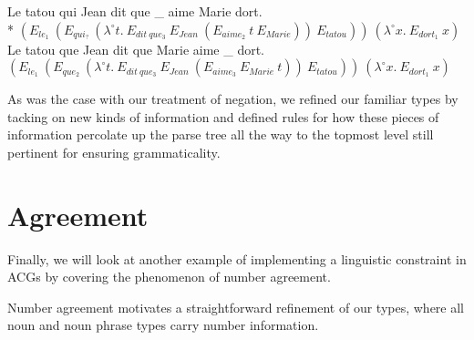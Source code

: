 \begin{exe}
  \ex * \label{ex:bad-ext} Le tatou qui Jean dit que \_ aime Marie dort. \\
      * $(E_{le_1}\ (E_{qui_?}\ (\lambda^{\circ} t.\ E_{dit\ que_3}\ E_{Jean}\ (E_{aime_2}\ t\ E_{Marie}))\ E_{tatou}))\ (\lambda^{\circ} x.\ E_{dort_1}\ x)$
  \ex \label{ex:good-ext} Le tatou que Jean dit que Marie aime \_ dort. \\
      $(E_{le_1}\ (E_{que_2}\ (\lambda^{\circ} t.\ E_{dit\ que_3}\ E_{Jean}\ (E_{aime_3}\ E_{Marie}\ t))\ E_{tatou}))\ (\lambda^{\circ} x.\ E_{dort_1}\ x)$
\end{exe}

As was the case with our treatment of negation, we refined our familiar
types by tacking on new kinds of information and defined rules for how
these pieces of information percolate up the parse tree all the way to
the topmost level still pertinent for ensuring grammaticality.


\section{Agreement}
\label{sec:agreement}

Finally, we will look at another example of implementing a linguistic
constraint in ACGs by covering the phenomenon of number
agreement.

Number agreement motivates a straightforward refinement of our types,
where all noun and noun phrase types carry number information.

